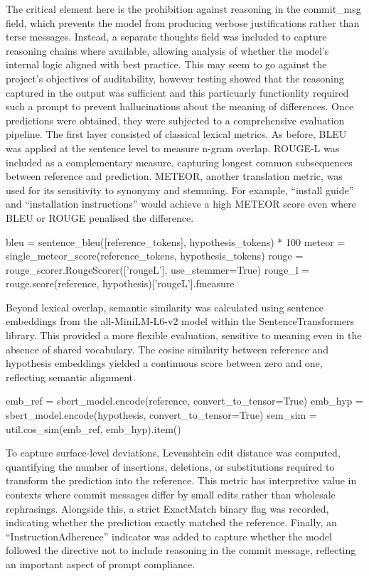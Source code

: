 \documentclass{report}
\begin{document}
The critical element here is the prohibition against reasoning in the commit_msg field, which prevents the model from producing verbose justifications rather than terse messages. 
Instead, a separate thoughts field was included to capture reasoning chains where available, allowing analysis of whether the model’s internal logic aligned with best practice.
This may seem to go against the project's objectives of auditability, however testing showed that the reasoning captured in the output was sufficient and this particuarly functionlity required such a prompt to prevent hallucinations about the meaning of differences.
Once predictions were obtained, they were subjected to a comprehensive evaluation pipeline. 
The first layer consisted of classical lexical metrics. 
As before, BLEU was applied at the sentence level to measure n-gram overlap. 
ROUGE-L was included as a complementary measure, capturing longest common subsequences between reference and prediction. 
METEOR, another translation metric, was used for its sensitivity to synonymy and stemming. 
For example, “install guide” and “installation instructions” would achieve a high METEOR score even where BLEU or ROUGE penalised the difference.

\begin{python}
bleu = sentence_bleu([reference_tokens], hypothesis_tokens) * 100
meteor = single_meteor_score(reference_tokens, hypothesis_tokens)
rouge = rouge_scorer.RougeScorer(['rougeL'], use_stemmer=True)
rouge_l = rouge.score(reference, hypothesis)['rougeL'].fmeasure

\end{python}

Beyond lexical overlap, semantic similarity was calculated using sentence embeddings from the all-MiniLM-L6-v2 model within the SentenceTransformers library. 
This provided a more flexible evaluation, sensitive to meaning even in the absence of shared vocabulary. 
The cosine similarity between reference and hypothesis embeddings yielded a continuous score between zero and one, reflecting semantic alignment.

\begin{python}
emb_ref = sbert_model.encode(reference, convert_to_tensor=True)
emb_hyp = sbert_model.encode(hypothesis, convert_to_tensor=True)
sem_sim = util.cos_sim(emb_ref, emb_hyp).item()

\end{python}

To capture surface-level deviations, Levenshtein edit distance was computed, quantifying the number of insertions, deletions, or substitutions required to transform the prediction into the reference. 
This metric has interpretive value in contexts where commit messages differ by small edits rather than wholesale rephrasings. 
Alongside this, a strict ExactMatch binary flag was recorded, indicating whether the prediction exactly matched the reference. 
Finally, an “InstructionAdherence” indicator was added to capture whether the model followed the directive not to include reasoning in the commit message, reflecting an important aspect of prompt compliance.
\end{document}
